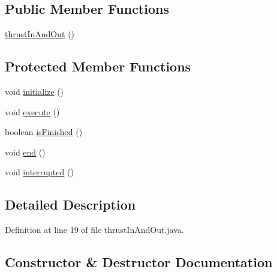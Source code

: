 \subsection*{Public Member Functions}
\begin{DoxyCompactItemize}
\item 
\mbox{\hyperlink{classorg_1_1usfirst_1_1frc3707_1_1_creedence_1_1commands_1_1thrust_in_and_out_a20497012fbb98388c4ded7204410a088}{thrust\+In\+And\+Out}} ()
\end{DoxyCompactItemize}
\subsection*{Protected Member Functions}
\begin{DoxyCompactItemize}
\item 
void \mbox{\hyperlink{classorg_1_1usfirst_1_1frc3707_1_1_creedence_1_1commands_1_1thrust_in_and_out_a3cd378b4317469dca9fd5e3082734527}{initialize}} ()
\item 
void \mbox{\hyperlink{classorg_1_1usfirst_1_1frc3707_1_1_creedence_1_1commands_1_1thrust_in_and_out_a046960dd9377d7f7f8aabf91e9afea8b}{execute}} ()
\item 
boolean \mbox{\hyperlink{classorg_1_1usfirst_1_1frc3707_1_1_creedence_1_1commands_1_1thrust_in_and_out_aed80c89c8005eb64b63a586f78f5e3e3}{is\+Finished}} ()
\item 
void \mbox{\hyperlink{classorg_1_1usfirst_1_1frc3707_1_1_creedence_1_1commands_1_1thrust_in_and_out_ae239f2b8144b5351b4fb17db99174cdf}{end}} ()
\item 
void \mbox{\hyperlink{classorg_1_1usfirst_1_1frc3707_1_1_creedence_1_1commands_1_1thrust_in_and_out_a96c79654f2a8508fc2b926cdbe053502}{interrupted}} ()
\end{DoxyCompactItemize}


\subsection{Detailed Description}


Definition at line 19 of file thrust\+In\+And\+Out.\+java.



\subsection{Constructor \& Destructor Documentation}
\mbox{\label{classorg_1_1usfirst_1_1frc3707_1_1_creedence_1_1commands_1_1thrust_in_and_out_a20497012fbb98388c4ded7204410a088}} 
